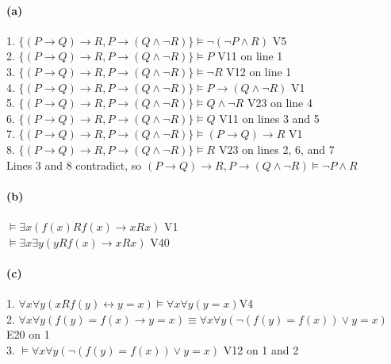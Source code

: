 \documentclass[10pt,letter]{article}
\begin{document}
\paragraph{(a)} 
1. $\{(P\rightarrow Q)\rightarrow R, P\rightarrow (Q \wedge\neg R)\} \models \neg(\neg P\wedge R)$ \hfill V5\\
2. $\{(P\rightarrow Q)\rightarrow R, P\rightarrow (Q \wedge\neg R)\} \models P$ \hfill V11 on line 1\\
3. $\{(P\rightarrow Q)\rightarrow R, P\rightarrow (Q \wedge\neg R)\} \models \neg R$ \hfill V12 on line 1\\
4. $\{(P\rightarrow Q)\rightarrow R, P\rightarrow (Q \wedge\neg R)\} \models P \rightarrow (Q \wedge \neg R)$ \hfill V1\\
5. $\{(P\rightarrow Q)\rightarrow R, P\rightarrow (Q \wedge\neg R)\} \models Q \wedge\neg R$ \hfill V23 on line 4\\
6. $\{(P\rightarrow Q)\rightarrow R, P\rightarrow (Q \wedge\neg R)\} \models Q$ \hfill V11 on lines 3 and 5\\
7. $\{(P\rightarrow Q)\rightarrow R, P\rightarrow (Q \wedge\neg R)\} \models (P\rightarrow Q)\rightarrow R$ \hfill V1\\
8. $\{(P\rightarrow Q)\rightarrow R, P\rightarrow (Q \wedge\neg R)\} \models R$ \hfill V23 on lines 2, 6, and 7\\ 

Lines 3 and 8 contradict, so $(P\rightarrow Q)\rightarrow R, P\rightarrow (Q \wedge\neg R) \models \neg P\wedge R$

\paragraph{(b)} $\models\exists x(f(x)Rf(x)\rightarrow xRx)$ \hfill V1\\
$\models\exists x\exists y(yRf(x)\rightarrow xRx)$ \hfill V40\\

\paragraph{(c)} 1. $\forall x\forall y(xRf(y) \leftrightarrow y = x) \models \forall x\forall y(y=x)$\hfill V4\\ 
2. $\forall x\forall y(f(y) = f(x) \rightarrow y = x) \equiv \forall x\forall y(\neg(f(y) = f(x)) \vee y = x)$ \hfill E20 on 1\\ 
3. $\models \forall x\forall y(\neg(f(y) = f(x)) \vee y = x)$ \hfill V12 on 1 and 2\\ 
\end{document}

